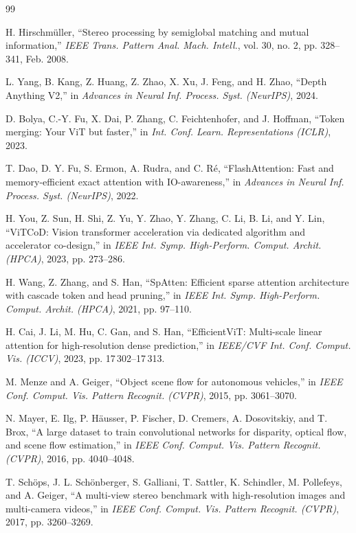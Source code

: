\documentclass[journal]{IEEEtran}
\begin{document}
\begin{thebibliography}{99}


H. Hirschm\"uller, ``Stereo processing by semiglobal matching and mutual information,'' \textit{IEEE Trans. Pattern Anal. Mach. Intell.}, vol. 30, no. 2, pp. 328--341, Feb. 2008.

L. Yang, B. Kang, Z. Huang, Z. Zhao, X. Xu, J. Feng, and H. Zhao, ``Depth Anything V2,'' in \textit{Advances in Neural Inf. Process. Syst. (NeurIPS)}, 2024.

D. Bolya, C.-Y. Fu, X. Dai, P. Zhang, C. Feichtenhofer, and J. Hoffman, ``Token merging: Your ViT but faster,'' in \textit{Int. Conf. Learn. Representations (ICLR)}, 2023.

T. Dao, D. Y. Fu, S. Ermon, A. Rudra, and C. R\'e, ``FlashAttention: Fast and memory-efficient exact attention with IO-awareness,'' in \textit{Advances in Neural Inf. Process. Syst. (NeurIPS)}, 2022.

H. You, Z. Sun, H. Shi, Z. Yu, Y. Zhao, Y. Zhang, C. Li, B. Li, and Y. Lin, ``ViTCoD: Vision transformer acceleration via dedicated algorithm and accelerator co-design,'' in \textit{IEEE Int. Symp. High-Perform. Comput. Archit. (HPCA)}, 2023, pp. 273--286.

H. Wang, Z. Zhang, and S. Han, ``SpAtten: Efficient sparse attention architecture with cascade token and head pruning,'' in \textit{IEEE Int. Symp. High-Perform. Comput. Archit. (HPCA)}, 2021, pp. 97--110.

H. Cai, J. Li, M. Hu, C. Gan, and S. Han, ``EfficientViT: Multi-scale linear attention for high-resolution dense prediction,'' in \textit{IEEE/CVF Int. Conf. Comput. Vis. (ICCV)}, 2023, pp. 17\,302--17\,313.

M. Menze and A. Geiger, ``Object scene flow for autonomous vehicles,'' in \textit{IEEE Conf. Comput. Vis. Pattern Recognit. (CVPR)}, 2015, pp. 3061--3070.

N. Mayer, E. Ilg, P. H\"ausser, P. Fischer, D. Cremers, A. Dosovitskiy, and T. Brox, ``A large dataset to train convolutional networks for disparity, optical flow, and scene flow estimation,'' in \textit{IEEE Conf. Comput. Vis. Pattern Recognit. (CVPR)}, 2016, pp. 4040--4048.

T. Sch\"ops, J. L. Sch\"onberger, S. Galliani, T. Sattler, K. Schindler, M. Pollefeys, and A. Geiger, ``A multi-view stereo benchmark with high-resolution images and multi-camera videos,'' in \textit{IEEE Conf. Comput. Vis. Pattern Recognit. (CVPR)}, 2017, pp. 3260--3269.


\end{thebibliography}
\end{document}
